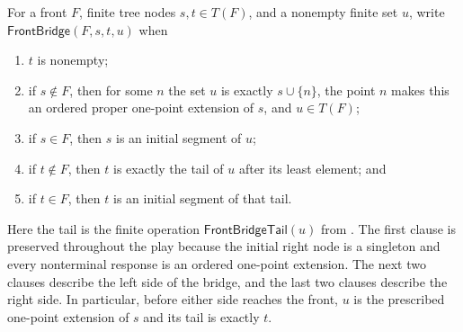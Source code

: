 \begin{definition}
For a front $F$, finite tree nodes $s,t\in T(F)$, and a nonempty finite
set $u$, write $\mathsf{FrontBridge}(F,s,t,u)$ when
\begin{enumerate}
\item $t$ is nonempty;
\item if $s\notin F$, then for some $n$ the set $u$ is exactly
      $s\cup\{n\}$, the point $n$ makes this an ordered proper
      one-point extension of $s$, and $u\in T(F)$;
\item if $s\in F$, then $s$ is an initial segment of $u$;
\item if $t\notin F$, then $t$ is exactly the tail of $u$ after its least
      element; and
\item if $t\in F$, then $t$ is an initial segment of that tail.
\end{enumerate}
Here the tail is the finite operation
$\mathsf{FrontBridgeTail}(u)$ from .
The first clause is preserved throughout the play because the initial
right node is a singleton and every nonterminal response is an ordered
one-point extension.  The next two clauses describe the left side of the
bridge, and the last two clauses describe the right side.  In particular,
before either side reaches the front, $u$ is the prescribed one-point
extension of $s$ and its tail is exactly $t$.
\end{definition}
